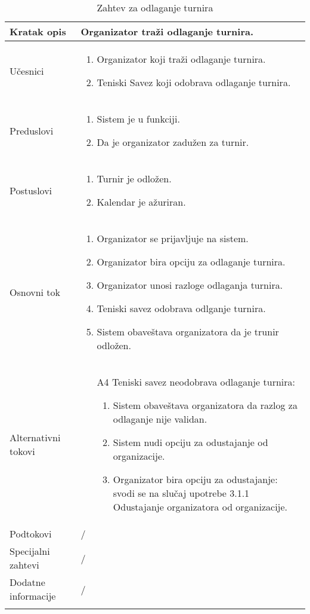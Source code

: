 \documentclass{article}
\begin{document}
\begin{longtable}{| p{} | p{} |} 
\hline
    Kratak opis & Organizator traži odlaganje turnira.\\ 
\hline    
    Učesnici & \begin{enumerate}
        \item Organizator koji traži odlaganje turnira.
        \item Teniski Savez koji odobrava odlaganje turnira.
    \end{enumerate}
    \\
\hline
   Preduslovi & \begin{enumerate}
       \item Sistem je u funkciji.
       \item Da je organizator zadužen za turnir.
   \end{enumerate}\\
\hline  
    Postuslovi & \begin{enumerate}
        \item Turnir je odložen. 
        \item Kalendar je ažuriran. 
    \end{enumerate}\\
\hline
    Osnovni tok & \begin{enumerate}
        \item Organizator se prijavljuje na sistem.
        \item Organizator bira opciju za odlaganje turnira.
        \item Organizator unosi razloge odlaganja turnira.
        \item Teniski savez odobrava odlganje turnira.
        \item Sistem obaveštava organizatora da je trunir odložen.
    \end{enumerate}\\
\hline
    Alternativni tokovi & \begin{enumerate}
        \item [A4] Teniski savez neodobrava odlaganje turnira: 
        \begin{enumerate}
            \item Sistem obaveštava organizatora da razlog za odlaganje nije validan. 
            \item Sistem nudi opciju za odustajanje od organizacije.
            \item Organizator bira opciju za odustajanje: svodi se na slučaj upotrebe 3.1.1 Odustajanje organizatora od organizacije.
        \end{enumerate}
    \end{enumerate}\\
\hline
    Podtokovi & /\\
\hline
    Specijalni zahtevi & /\\
\hline
    Dodatne informacije & /\\
\hline

\caption{Zahtev za odlaganje turnira} 
\end{longtable}
\end{document}
